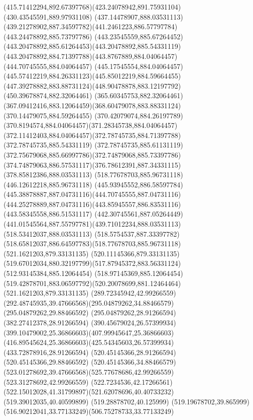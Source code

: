 {{\curveto(415.71412294,892.67397768)(423.24078942,891.75931104)(430.43545591,889.97931108)
\moveto(437.14478907,888.03531113)
\curveto(439.21278902,887.34597782)(441.2461223,886.57797784)(443.24478892,885.73797786)
\curveto(443.23545559,885.67264452)(443.20478892,885.61264453)(443.20478892,885.54331119)
\curveto(443.20478892,884.71397788)(443.8767889,884.04064457)(444.70745555,884.04064457)
\curveto(445.17545554,884.04064457)(445.57412219,884.26331123)(445.85012219,884.59664455)
\curveto(447.39278882,883.88731124)(448.90478878,883.12197792)(450.39678874,882.32064461)
\lineto(365.60345753,882.32064461)
\curveto(367.09412416,883.12064459)(368.60479078,883.88331124)(370.14479075,884.59264455)
\curveto(370.42079074,884.26197789)(370.8194574,884.04064457)(371.28345738,884.04064457)
\curveto(372.11412403,884.04064457)(372.78745735,884.71397788)(372.78745735,885.54331119)
\curveto(372.78745735,885.61131119)(372.75679068,885.66997786)(372.74879068,885.73397786)
\curveto(374.74879063,886.57531117)(376.78612391,887.34331115)(378.85812386,888.03531113)
\closepath
\moveto(518.77678703,885.96731118)
\lineto(446.12612218,885.96731118)
\curveto(445.93945552,886.58597784)(445.38878887,887.04731116)(444.70745555,887.04731116)
\curveto(444.25278889,887.04731116)(443.85945557,886.83531116)(443.58345558,886.51531117)
\curveto(442.30745561,887.05264449)(441.01545564,887.55797781)(439.71012234,888.03531113)
\lineto(518.53412037,888.03531113)
\curveto(518.5754537,887.33397782)(518.65812037,886.64597783)(518.77678703,885.96731118)
\moveto(521.1621203,879.33131135)
\lineto(520.11145366,879.33131135)
\curveto(519.67012034,880.32197799)(517.87945372,883.56331124)(512.93145384,885.12064454)
\lineto(518.97145369,885.12064454)
\curveto(519.42878701,883.06597792)(520.20078699,881.12464464)(521.1621203,879.33131135)
\moveto(289.72345942,42.99266559)
\curveto(292.48745935,39.47666568)(295.04879262,34.88466579)(295.04879262,29.88466592)
\lineto(295.04879262,28.91266594)
\lineto(382.27412378,28.91266594)
\curveto(390.45679024,26.57399934)(399.10479002,25.36866603)(407.99945647,25.36866603)
\curveto(416.89545624,25.36866603)(425.54345603,26.57399934)(433.72878916,28.91266594)
\lineto(520.45145366,28.91266594)
\lineto(520.45145366,29.88466592)
\curveto(520.45145366,34.88466579)(523.01278692,39.47666568)(525.77678686,42.99266559)
\lineto(523.31278692,42.99266559)
\curveto(522.7234536,42.17266561)(522.15012028,41.31799897)(521.62078696,40.40733232)
\lineto(519.39012035,40.40599899)
\lineto(519.28878702,40.125999)
\curveto(519.19678702,39.865999)(516.90212041,33.77133249)(506.75278733,33.77133249)
}}
